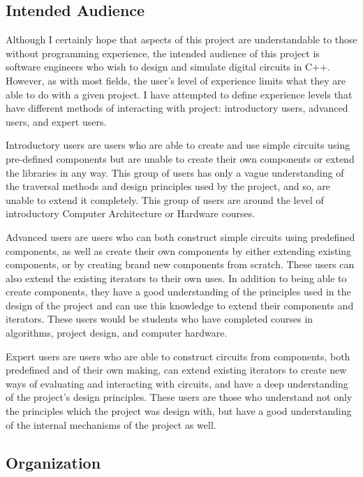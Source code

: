 \documentclass{article}
\begin{document}
\subsection{Intended Audience}

Although I certainly hope that aspects of this project are understandable to those without programming experience, the intended audience of this project is software engineers who wish to design and simulate digital circuits in C++. However, as with most fields, the user's level of experience limits what they are able to do with a given project. I have attempted to define experience levels that have different methods of interacting with project: introductory users, advanced users, and expert users.

Introductory users are users who are able to create and use simple circuits using pre-defined components but are unable to create their own components or extend the libraries in any way. This group of users has only a vague understanding of the traversal methods and design principles used by the project, and so, are unable to extend it completely. This group of users are around the level of introductory Computer Architecture or Hardware courses.

Advanced users are users who can both construct simple circuits using predefined components, as well as create their own components by either extending existing components, or by creating brand new components from scratch. These users can also extend the existing iterators to their own uses. In addition to being able to create components, they have a good understanding of the principles used in the design of the project and can use this knowledge to extend their components and iterators. These users would be students who have completed courses in algorithms, project design, and computer hardware.

Expert users are users who are able to construct circuits from components, both predefined and of their own making, can extend existing iterators to create new ways of evaluating and interacting with circuits, and have a deep understanding of the project's design principles. These users are those who understand not only the principles which the project was design with, but have a good understanding of the internal mechanisms of the project as well.

\subsection{Organization}
\end{document}
